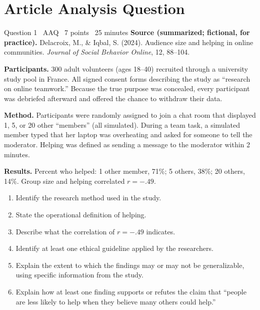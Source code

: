 \documentclass[11pt]{article}
\begin{document}
\section{Article Analysis Question}

\begin{frq}{Question 1 \textperiodcentered\ AAQ \textperiodcentered\ 7 points \textperiodcentered\ 25 minutes}
\small
\textbf{Source (summarized; fictional, for practice).} Delacroix, M., \& Iqbal, S. (2024). Audience size and helping in online communities. \emph{Journal of Social Behavior Online}, 12, 88--104.

\textbf{Participants.} 300 adult volunteers (ages 18--40) recruited through a university study pool in France. All signed consent forms describing the study as ``research on online teamwork.'' Because the true purpose was concealed, every participant was debriefed afterward and offered the chance to withdraw their data.

\textbf{Method.} Participants were randomly assigned to join a chat room that displayed 1, 5, or 20 other ``members'' (all simulated). During a team task, a simulated member typed that her laptop was overheating and asked for someone to tell the moderator. Helping was defined as sending a message to the moderator within 2 minutes.

\textbf{Results.} Percent who helped: 1 other member, 71\%; 5 others, 38\%; 20 others, 14\%. Group size and helping correlated \(r = -.49\).

\medskip
\begin{enumerate}[label=(\Alph*),leftmargin=2em,itemsep=3pt]
\item Identify the research method used in the study.
\item State the operational definition of helping.
\item Describe what the correlation of \(r = -.49\) indicates.
\item Identify at least one ethical guideline applied by the researchers.
\item Explain the extent to which the findings may or may not be generalizable, using specific information from the study.
\item Explain how at least one finding supports or refutes the claim that ``people are less likely to help when they believe many others could help.''
\end{enumerate}
\end{frq}

\makekey
\end{document}
